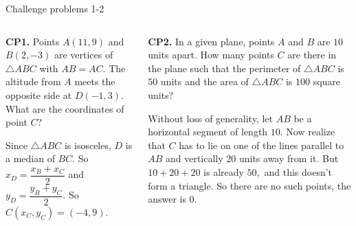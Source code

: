 \documentclass[9pt,aspectratio=169]{beamer}
\begin{document}
\begin{frame}{Challenge problems 1-2}
  \begin{columns}[T]
    \begin{column}{0.5\textwidth}
      \begin{problem}
        \textbf{CP1.} Points $A(11, 9)$ and $B(2, -3)$ are vertices of $\triangle ABC$ with $AB=AC$. The altitude from $A$ meets the opposite side at $D(-1, 3)$. What are the coordinates of point $C$?
      \end{problem}\pause
      Since $\triangle ABC$ is isosceles, $D$ is a median of $BC$. So $x_D = \dfrac{x_B + x_C}{2}$ and $y_D = \dfrac{y_B + y_C}{2}$. So $C(x_C, y_C) = \boxed{(-4, 9)}$.\pause
    \end{column}
    \begin{column}{0.5\textwidth}
      \begin{problem}
        \textbf{CP2.} In a given plane, points $A$ and $B$ are $10$ units apart. How many points $C$ are there in the plane such that the perimeter of $\triangle ABC$ is $50$ units and the area of $\triangle ABC$ is $100$ square units?
      \end{problem}\pause

      Without loss of generality, let $AB$ be a horizontal segment of length $10$. Now realize that $C$ has to lie on one of the lines parallel to $AB$ and vertically $20$ units away from it. But $10+20+20$ is already $50,$ and this doesn't form a triangle. So there are no such points, the answer is $\boxed{0}$.
    \end{column}
  \end{columns}
\end{frame}
\end{document}
